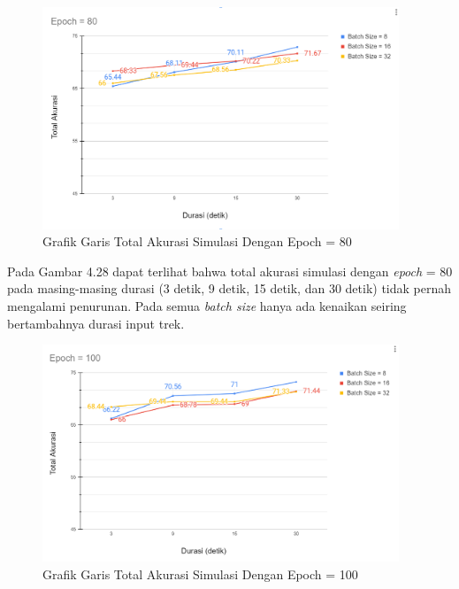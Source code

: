 \begin{figure}[H]
	\centering
	
	\includegraphics[width=0.95\textwidth]{gambar/e80_chart_sum accuracy}
	
	\caption{Grafik Garis Total Akurasi Simulasi Dengan Epoch = 80}
	\label{fig:sumcharte80}
\end{figure}

Pada Gambar 4.28 dapat terlihat bahwa total akurasi simulasi dengan \emph{epoch} = 80 pada masing-masing durasi (3 detik, 9 detik, 15 detik, dan 30 detik) tidak pernah mengalami penurunan. Pada semua \emph{batch size} hanya ada kenaikan seiring bertambahnya durasi input trek.

\begin{figure}[H]
	\centering
	
	\includegraphics[width=0.95\textwidth]{gambar/e100_chart_sum accuracy}
	
	\caption{Grafik Garis Total Akurasi Simulasi Dengan Epoch = 100}
	\label{fig:sumcharte100}
\end{figure}


